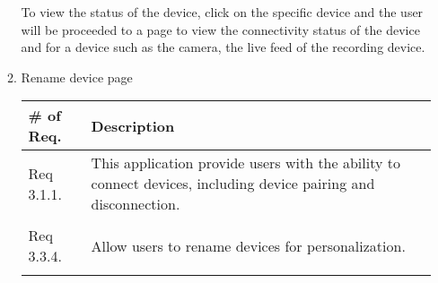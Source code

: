 \begin{enumerate}[label=\arabic*.]
\begin{enumerate}[label*={\arabic*.},ref=\theenumi.\arabic*]
                    To view the status of the device, click on the specific device and the user will be proceeded to a page to view the connectivity status of the device and for a device such as the camera, the live feed of the recording device. \\
                    \newpage
              \item Rename device page
                    \begin{table}[H]
                        \center
                        \begin{tabular}{m{1.4cm} m{5.5cm}}
                            \toprule
                            \# of Req. & Description                                                                                                     \\
                            \midrule
                            Req 3.1.1. & This application provide users with the ability to connect devices, including device pairing and disconnection. \\\\
                            Req 3.3.4. & Allow users to rename devices for personalization.                                                              \\\\
                            \bottomrule
                        \end{tabular}
                    \end{table}


\end{enumerate}
\end{enumerate}
